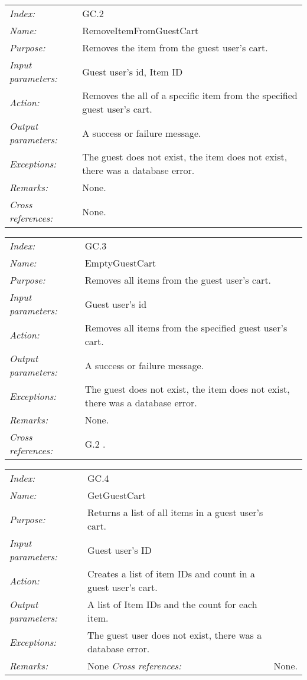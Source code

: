 \documentclass[10pt,letter]{article}
\begin{document}
\begin{tabularx}{\textwidth}{l X}
    \it{Index:} & GC.2 \\
    \it{Name:} & RemoveItemFromGuestCart \\
    \it{Purpose:} & Removes the item from the guest user's cart. \\
    \it{Input parameters:} & Guest user's id, Item ID \\
    \it{Action:} & Removes the all of a specific item from the specified guest user's cart. \\
    \it{Output parameters:} & A success or failure message. \\
    \it{Exceptions:} & The guest does not exist, the item does not exist, there was a database error. \\
    \it{Remarks:} & None. \\
    \it{Cross references:} & None. \\
    \hline
\end{tabularx}

\begin{tabularx}{\textwidth}{l X}
    \it{Index:} & GC.3 \\
    \it{Name:} & EmptyGuestCart \\
    \it{Purpose:} & Removes all items from the guest user's cart. \\
    \it{Input parameters:} & Guest user's id \\
    \it{Action:} & Removes all items from the specified guest user's cart. \\
    \it{Output parameters:} & A success or failure message. \\
    \it{Exceptions:} & The guest does not exist, the item does not exist, there was a database error. \\
    \it{Remarks:} & None. \\
    \it{Cross references:} & G.2 . \\
    \hline
\end{tabularx}

\begin{tabularx}{\textwidth}{l X}
    \it{Index:} & GC.4 \\
    \it{Name:} & GetGuestCart \\
    \it{Purpose:} & Returns a list of all items in a guest user's cart. \\
    \it{Input parameters:} & Guest user's ID \\
    \it{Action:} & Creates a list of item IDs and count in a guest user's cart. \\
    \it{Output parameters:} & A list of Item IDs and the count for each item. \\
    \it{Exceptions:} & The guest user does not exist, there was a database error. \\
    \it{Remarks:} & None 
    \it{Cross references:} & None. \\
    \hline
\end{tabularx}
\end{document}
